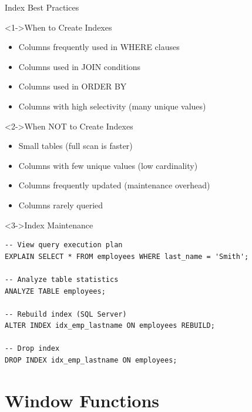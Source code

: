 \documentclass[aspectratio=169,11pt]{beamer}
\begin{document}
\begin{frame}[fragile]{Index Best Practices}
\begin{block}<1->{When to Create Indexes}
\begin{itemize}
    \item Columns frequently used in WHERE clauses
    \item Columns used in JOIN conditions
    \item Columns used in ORDER BY
    \item Columns with high selectivity (many unique values)
\end{itemize}
\end{block}

\pause
\begin{block}<2->{When NOT to Create Indexes}
\begin{itemize}
    \item Small tables (full scan is faster)
    \item Columns with few unique values (low cardinality)
    \item Columns frequently updated (maintenance overhead)
    \item Columns rarely queried
\end{itemize}
\end{block}

\pause
\begin{exampleblock}<3->{Index Maintenance}
\begin{lstlisting}
-- View query execution plan
EXPLAIN SELECT * FROM employees WHERE last_name = 'Smith';

-- Analyze table statistics
ANALYZE TABLE employees;

-- Rebuild index (SQL Server)
ALTER INDEX idx_emp_lastname ON employees REBUILD;

-- Drop index
DROP INDEX idx_emp_lastname ON employees;
\end{lstlisting}
\end{exampleblock}
\end{frame}

\section{Window Functions}
\end{document}

